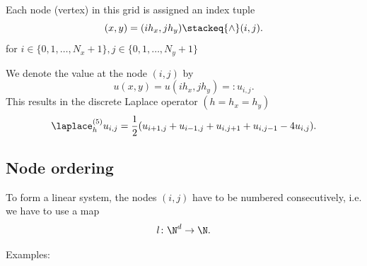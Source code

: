 
Each node (vertex) in this grid is assigned an index tuple
\[
	(x,y) = (ih_{x}, jh_{y}) \stackeq{\wedge} (i,j)
.\] 
for $i \in \{0,1, \ldots , N_{x}+1\}, j \in  \{0,1, \ldots , N_{y}+1\}$

We denote the value at the node $(i,j)$ by
\[
	u(x,y)=u(ih_{x},jh_{y})=:u_{i,j}
.\] 
This results in the discrete Laplace operator $(h=h_{x}=h_{y})$
\[
	\laplace_{h}^{(5)}u_{i,j}=\frac{1}{2}(u_{i+1,j}+u_{i-1,j} +u_{i,j+1}+ u_{i,j-1} - 4u_{i,j})
.\]

\newpage
\subsection{Node ordering}%
\label{sec:Node ordering}
To form a linear system, the nodes $(i,j)$ have to be numbered consecutively, i.e. we have to use a map
\[
	l\colon \N^{d} \rightarrow \N
.\] 

Examples:

